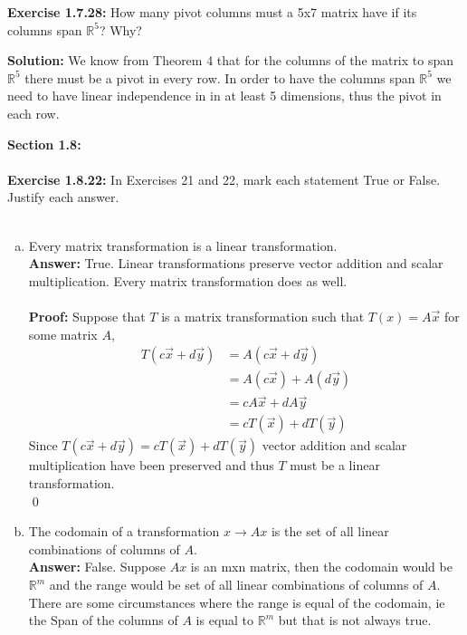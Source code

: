 \documentclass{amsart}
\def\RR{{\mathbb R}}
\begin{document}
\begin{enumerate}[(a)]
\noindent\textbf{Exercise 1.7.28: } How many pivot columns must a 5x7 matrix have if its columns span $\RR^{5}$? Why?

\noindent \textbf{Solution: }We know from Theorem 4 that for the columns of the matrix to span $\RR^{5}$ there must be a pivot in every row. In order to have the columns span $\RR^{5}$ we need to have linear independence in in at least 5 dimensions, thus the pivot in each row.
\vspace{1in}




{\huge\textbf{Section 1.8:}}\\\\
\noindent\textbf{Exercise 1.8.22: } In Exercises 21 and 22, mark each statement True or False. Justify each answer.\\\\
\begin{enumerate}[(a)]

\item Every matrix transformation is a linear transformation.\\
\noindent \textbf{Answer: } True. Linear transformations preserve vector addition and scalar multiplication. Every matrix  transformation does as well.\\\\
\textbf{Proof:} Suppose that $T$ is a matrix transformation such that $T(x)=A\vec{x}$ for some matrix $A$,
\begin{align}
T(c\vec{x}+d\vec{y})&=A(c\vec{x}+d\vec{y})\\
&=A(c\vec{x})+A(d\vec{y})\\
&=cA\vec{x}+dA\vec{y}\\
&=cT(\vec{x})+dT(\vec{y})
\end{align}
Since $T(c\vec{x}+d\vec{y})=cT(\vec{x})+dT(\vec{y})$ vector addition and scalar multiplication have been preserved and thus $T$ must be a linear transformation.\\
\qed
\vspace{1in}

\item The codomain of a transformation $x \to Ax$ is the set of all linear combinations of columns of $A$.\\
\noindent \textbf{Answer: } False. Suppose $Ax$ is an mxn matrix, then the codomain would be $\RR^{m}$ and the range would be set of all linear combinations of columns of $A$. There are some circumstances where the range is equal of the codomain, ie the Span of the columns of $A$ is equal to $\RR^{m}$ but that is not always true.
\vspace{1in}


\end{enumerate}
\end{enumerate}
\end{document}
